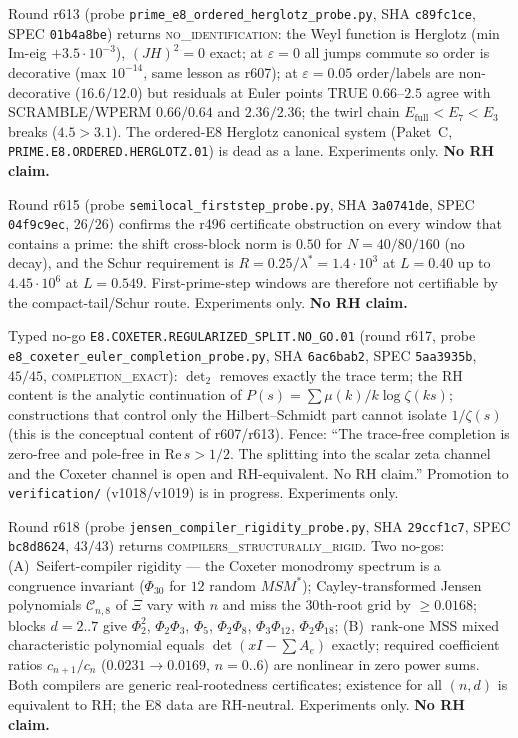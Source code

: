 \documentclass[11pt]{article}
\theoremstyle{definition}
\theoremstyle{remark}
\begin{document}
\noindent Round r613 (probe \texttt{prime\_e8\_ordered\_herglotz\_probe.py},
SHA \texttt{c89fc1ce}, SPEC \texttt{01b4a8be}) returns
\textsc{no\_identification}: the Weyl function is Herglotz
(min Im-eig $+3.5\cdot10^{-3}$), $(JH)^2=0$ exact; at $\varepsilon=0$
all jumps commute so order is decorative (max $10^{-14}$, same lesson
as r607); at $\varepsilon=0.05$ order/labels are non-decorative
($16.6/12.0$) but residuals at Euler points TRUE $0.66$--$2.5$ agree
with SCRAMBLE/WPERM $0.66/0.64$ and $2.36/2.36$; the twirl chain
$E_{\mathrm{full}}<E_7<E_3$ breaks ($4.5>3.1$).  The ordered-E8
Herglotz canonical system (Paket~C,
\texttt{PRIME.E8.ORDERED.HERGLOTZ.01}) is dead as a lane.
Experiments only.  \textbf{No RH claim.}

\noindent Round r615 (probe \texttt{semilocal\_firststep\_probe.py},
SHA \texttt{3a0741de}, SPEC \texttt{04f9c9ec}, $26/26$) confirms the
r496 certificate obstruction on every window that contains a prime:
the shift cross-block norm is $0.50$ for $N=40/80/160$ (no decay), and
the Schur requirement is $R=0.25/\lambda^*=1.4\cdot10^{3}$ at
$L=0.40$ up to $4.45\cdot10^{6}$ at $L=0.549$.  First-prime-step
windows are therefore not certifiable by the compact-tail/Schur route.
Experiments only.  \textbf{No RH claim.}

\noindent Typed no-go \texttt{E8.COXETER.REGULARIZED\_SPLIT.NO\_GO.01}
(round r617, probe \texttt{e8\_coxeter\_euler\_completion\_probe.py},
SHA \texttt{6ac6bab2}, SPEC \texttt{5aa3935b}, $45/45$,
\textsc{completion\_exact}): $\det_2$ removes exactly the trace term;
the RH content is the analytic continuation of
$P(s)=\sum\mu(k)/k\log\zeta(ks)$; constructions that control only the
Hilbert--Schmidt part cannot isolate $1/\zeta(s)$ (this is the
conceptual content of r607/r613).  Fence: ``The trace-free completion
is zero-free and pole-free in $\mathrm{Re}\,s>1/2$. The splitting into
the scalar zeta channel and the Coxeter channel is open and
RH-equivalent. No RH claim.''  Promotion to \texttt{verification/}
(v1018/v1019) is in progress.  Experiments only.

\noindent Round r618 (probe \texttt{jensen\_compiler\_rigidity\_probe.py},
SHA \texttt{29ccf1c7}, SPEC \texttt{bc8d8624}, $43/43$) returns
\textsc{compilers\_structurally\_rigid}.  Two no-gos:
(A)~Seifert-compiler rigidity --- the Coxeter monodromy spectrum is a
congruence invariant ($\Phi_{30}$ for $12$ random $MSM^*$);
Cayley-transformed Jensen polynomials $\mathcal{C}_{n,8}$ of $\Xi$
vary with $n$ and miss the $30$th-root grid by $\ge 0.0168$; blocks
$d=2..7$ give $\Phi_2^2$, $\Phi_2\Phi_3$, $\Phi_5$, $\Phi_2\Phi_8$,
$\Phi_3\Phi_{12}$, $\Phi_2\Phi_{18}$;
(B)~rank-one MSS mixed characteristic polynomial equals
$\det(xI-\sum A_e)$ exactly; required coefficient ratios
$c_{n+1}/c_n$ ($0.0231\to 0.0169$, $n=0..6$) are nonlinear in zero
power sums.  Both compilers are generic real-rootedness certificates;
existence for all $(n,d)$ is equivalent to RH; the E8 data are
RH-neutral.  Experiments only.  \textbf{No RH claim.}
\end{document}
